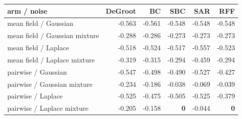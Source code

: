 {\small\setlength{\tabcolsep}{3pt}
\begin{tabular}{lrrrrr}
\toprule
arm / noise & DeGroot & BC & SBC & SAR & RFF \\
\midrule
mean field / Gaussian & -0.563 & -0.561 & -0.548 & -0.548 & -0.548 \\
mean field / Gaussian mixture & -0.288 & -0.286 & -0.273 & -0.273 & -0.273 \\
mean field / Laplace & -0.518 & -0.524 & -0.517 & -0.557 & -0.523 \\
mean field / Laplace mixture & -0.319 & -0.315 & -0.294 & -0.459 & -0.294 \\
pairwise / Gaussian & -0.547 & -0.498 & -0.490 & -0.527 & -0.427 \\
pairwise / Gaussian mixture & -0.234 & -0.186 & -0.038 & -0.069 & -0.039 \\
pairwise / Laplace & -0.525 & -0.475 & -0.505 & -0.525 & -0.379 \\
pairwise / Laplace mixture & -0.205 & -0.158 & \textbf{0} & -0.044 & \textbf{0} \\
\bottomrule
\end{tabular}}
\par{}
